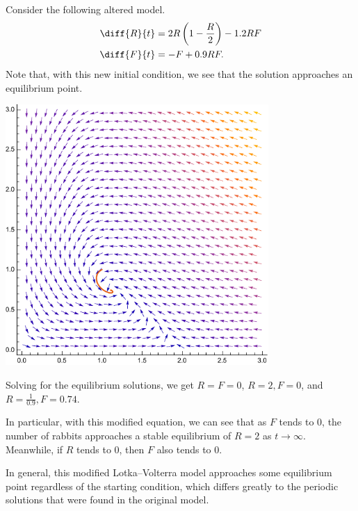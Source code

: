 \documentclass[10pt]{mypackage}
\begin{document}
\begin{example}
  Consider the following altered model.
\begin{align*}
  \diff{R}{t} &= 2R\left(1 - \frac{R}{2}\right) - 1.2RF\\
  \diff{F}{t} &= -F + 0.9RF.
\end{align*}
Note that, with this new initial condition, we see that the solution approaches an equilibrium point.
\begin{center}
  \includegraphics[width=10cm]{images/modified_lv_eqns_w_sol.pdf}
\end{center}
Solving for the equilibrium solutions, we get $R = F = 0$, $R = 2, F = 0$, and $R = \frac{1}{0.9},F = 0.74$.\newline

In particular, with this modified equation, we can see that as $F$ tends to $0$, the number of rabbits approaches a stable equilibrium of $R = 2$ as $t\rightarrow\infty$. Meanwhile, if $R$ tends to $0$, then $F$ also tends to $0$.\newline

In general, this modified Lotka--Volterra model approaches some equilibrium point regardless of the starting condition, which differs greatly to the periodic solutions that were found in the original model.
\end{example}
\end{document}
